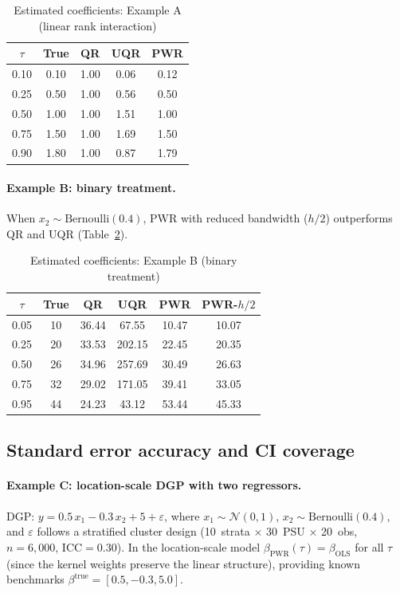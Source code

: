 \documentclass[12pt,a4paper]{article}
\theoremstyle{definition}
\begin{document}
\begin{table}[htbp]\centering\small
\caption{Estimated coefficients: Example A (linear rank interaction)}
\label{tab:mc_a}
\begin{tabular}{ccccc}
\toprule$\tau$&True&QR&UQR&PWR\\\midrule
0.10&0.10&1.00&0.06&0.12\\0.25&0.50&1.00&0.56&0.50\\
0.50&1.00&1.00&1.51&1.00\\0.75&1.50&1.00&1.69&1.50\\
0.90&1.80&1.00&0.87&1.79\\\bottomrule
\end{tabular}
\end{table}

\paragraph{Example B: binary treatment.}
When $x_2\sim\mathrm{Bernoulli}(0.4)$, PWR with reduced bandwidth
($h/2$) outperforms QR and UQR (Table~\ref{tab:mc_b}).

\begin{table}[htbp]\centering\small
\caption{Estimated coefficients: Example B (binary treatment)}
\label{tab:mc_b}
\begin{tabular}{cccccc}
\toprule$\tau$&True&QR&UQR&PWR&PWR-$h/2$\\\midrule
0.05&10&36.44&67.55&10.47&10.07\\0.25&20&33.53&202.15&22.45&20.35\\
0.50&26&34.96&257.69&30.49&26.63\\0.75&32&29.02&171.05&39.41&33.05\\
0.95&44&24.23&43.12&53.44&45.33\\\bottomrule
\end{tabular}
\end{table}

\subsection{Standard error accuracy and CI coverage}

\paragraph{Example C: location-scale DGP with two regressors.}

DGP: $y = 0.5\,x_1 - 0.3\,x_2 + 5 + \varepsilon$, where
$x_1\sim\mathcal{N}(0,1)$, $x_2\sim\mathrm{Bernoulli}(0.4)$, and
$\varepsilon$ follows a stratified cluster design (10~strata
$\times$ 30~PSU $\times$ 20~obs, $n=6{,}000$, ICC$=0.30$). In the
location-scale model $\beta_{\mathrm{PWR}}(\tau)=\beta_{\mathrm{OLS}}$
for all $\tau$ (since the kernel weights preserve the linear structure),
providing known benchmarks $\beta^{\mathrm{true}}=[0.5,-0.3,5.0]$.
\end{document}
